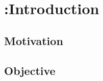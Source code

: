 \chapter[Introduction]{{\color{red} :}Introduction} \label{ch:intro}
%
\section{Motivation}\label{ch:motivation}

\kant[1]

\section{Objective}

\kant[2-3]
